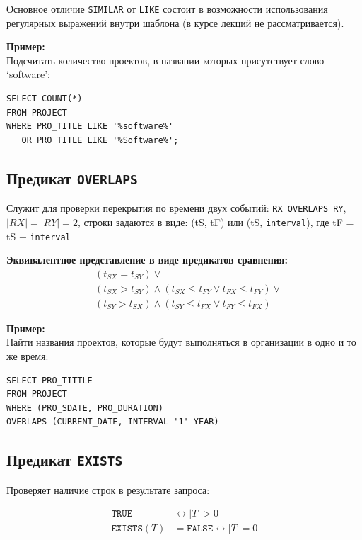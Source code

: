 \documentclass[a4paper,12pt]{article}
\begin{document}
Основное отличие \texttt{SIMILAR} от \texttt{LIKE} состоит в возможности использования регулярных выражений внутри шаблона (в курсе лекций не рассматривается).

\textbf{Пример:}\\
Подсчитать количество проектов, в названии которых присутствует слово ‘software’:
\begin{lstlisting}
SELECT COUNT(*) 
FROM PROJECT 
WHERE PRO_TITLE LIKE '%software%' 
   OR PRO_TITLE LIKE '%Software%';
\end{lstlisting}

\subsection{Предикат \texttt{OVERLAPS}}

Служит для проверки перекрытия по времени двух событий: \texttt{RX OVERLAPS RY}, $|RX|=|RY|=2$, строки задаются в виде: (tS, tF) или (tS, \texttt{interval}), где tF = tS + \texttt{interval}

\textbf{Эквивалентное представление в виде предикатов сравнения:}
\[
\begin{aligned}
& ( t_{SX} = t_{SY} ) \lor \\
& ( t_{SX} > t_{SY} ) \land ( t_{SX} \leq t_{FY} \lor t_{FX} \leq t_{FY} ) \lor \\
& ( t_{SY} > t_{SX} ) \land ( t_{SY} \leq t_{FX} \lor t_{FY} \leq t_{FX} )
\end{aligned}
\]

\textbf{Пример:}\\
Найти названия проектов, которые будут выполняться в организации в одно и то же время:
\begin{lstlisting}
SELECT PRO_TITTLE 
FROM PROJECT 
WHERE (PRO_SDATE, PRO_DURATION)
OVERLAPS (CURRENT_DATE, INTERVAL '1' YEAR)
\end{lstlisting}

\subsection{Предикат \texttt{EXISTS}}

Проверяет наличие строк в результате запроса:

\[
\begin{aligned}
\texttt{TRUE} &\leftrightarrow |T| > 0 \\
\texttt{EXISTS}(T) &= \texttt{FALSE} \leftrightarrow |T| = 0
\end{aligned}
\]
\end{document}
